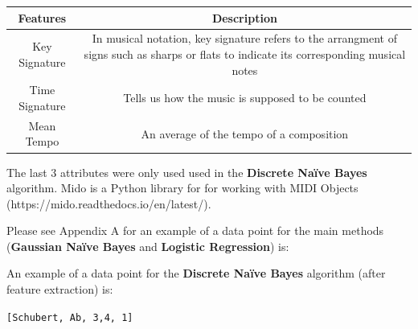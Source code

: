 \documentclass[11pt]{article}
\begin{document}
\begin{longtable}[c]{@{}cc@{}}
\toprule
\begin{minipage}[b]{0.15\columnwidth}\centering\strut
Features
\strut\end{minipage} &
\begin{minipage}[b]{0.79\columnwidth}\centering\strut
Description
\strut\end{minipage}\tabularnewline
\midrule
\endhead
\begin{minipage}[t]{0.15\columnwidth}\centering\strut
Key Signature
\strut\end{minipage} &
\begin{minipage}[t]{0.79\columnwidth}\centering\strut
In musical notation, key signature refers to the arrangment of signs
such as sharps or flats to indicate its corresponding musical notes
\strut\end{minipage}\tabularnewline
\begin{minipage}[t]{0.15\columnwidth}\centering\strut
Time Signature
\strut\end{minipage} &
\begin{minipage}[t]{0.79\columnwidth}\centering\strut
Tells us how the music is supposed to be counted
\strut\end{minipage}\tabularnewline
\begin{minipage}[t]{0.15\columnwidth}\centering\strut
Mean Tempo
\strut\end{minipage} &
\begin{minipage}[t]{0.79\columnwidth}\centering\strut
An average of the tempo of a composition
\strut\end{minipage}\tabularnewline
\bottomrule
\end{longtable}

The last 3 attributes were only used used in the \textbf{Discrete Naïve
Bayes} algorithm. Mido is a Python library for for working with MIDI
Objects (https://mido.readthedocs.io/en/latest/).

Please see Appendix A for an example of a data point for the main
methods (\textbf{Gaussian Naïve Bayes} and \textbf{Logistic Regression})
is:

An example of a data point for the \textbf{Discrete Naïve Bayes}
algorithm (after feature extraction) is:

\texttt{{[}\textquotesingle{}Schubert\textquotesingle{},\ \textquotesingle{}Ab\textquotesingle{},\ \textquotesingle{}3,4\textquotesingle{},\ 1{]}}

\newpage
\end{document}
